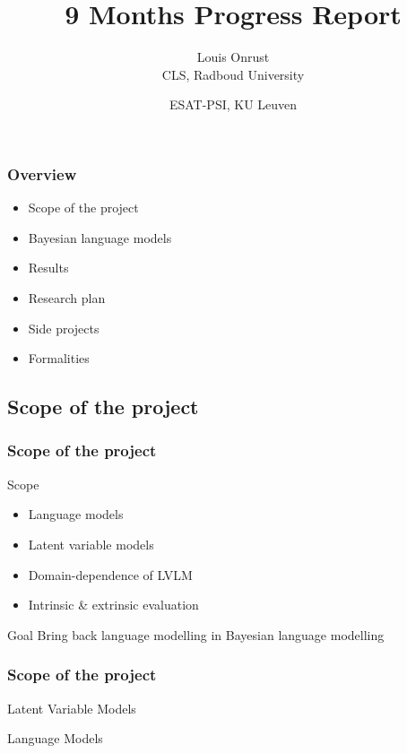 \documentclass{beamer}
\title{9 Months Progress Report}
\author{Louis Onrust \\ CLS, Radboud University \and ESAT-PSI, KU Leuven}
\begin{document}
\begin{frame}
    \titlepage
\end{frame}

\begin{frame}
    \frametitle{Overview}

    \begin{itemize}
        \item Scope of the project
        \item Bayesian language models
        \item Results
        \item Research plan
        \item Side projects
        \item Formalities
    \end{itemize}

\end{frame}

\begin{frame}\section{Scope of the project}
    \frametitle{Scope of the project}

    \begin{block}{Scope}
        \begin{itemize}
            \item Language models
            \item Latent variable models
            \item Domain-dependence of LVLM
            \item Intrinsic \& extrinsic evaluation
        \end{itemize}
    \end{block}

    \begin{block}{Goal}
        Bring back language modelling in Bayesian language modelling    
    \end{block}
\end{frame}

\begin{frame}
    \frametitle{Scope of the project}

    \begin{block}{Latent Variable Models}
    
    \end{block}

    \begin{block}{Language Models}

    \end{block}
\end{frame}
\end{document}
